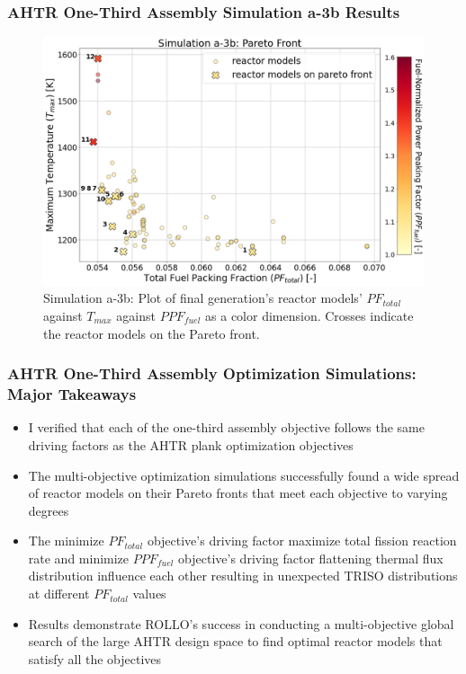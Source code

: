 \begin{frame}
    \frametitle{AHTR One-Third Assembly Simulation a-3b Results}
    \begin{figure}
        \includegraphics[width=0.9\linewidth]{../docs/figures/assem-obj-3-all-2d.png} 
        \caption{Simulation a-3b: Plot of final generation's reactor models' 
        $PF_{total}$ against $T_{max}$ against $PPF_{fuel}$ as a color dimension. 
        Crosses indicate the reactor models on the Pareto front.}
    \end{figure}
\end{frame}

\begin{frame}
    \frametitle{AHTR One-Third Assembly Optimization Simulations: Major Takeaways}
    \begin{itemize}
        \item I verified that each of the one-third assembly objective follows 
        the same driving factors as the AHTR plank optimization objectives
        \item The multi-objective optimization simulations successfully found a 
        wide spread of reactor models on their Pareto fronts that meet each 
        objective to varying degrees
        \item The minimize $PF_{total}$ objective's driving factor maximize 
        total fission reaction rate and minimize $PPF_{fuel}$ objective's driving 
        factor flattening thermal flux distribution influence each other resulting 
        in unexpected TRISO distributions at different $PF_{total}$ values 
        \item  Results demonstrate ROLLO's success in conducting a multi-objective 
        global search of the large AHTR design space to find optimal reactor models 
        that satisfy all the objectives
    \end{itemize}
\end{frame}